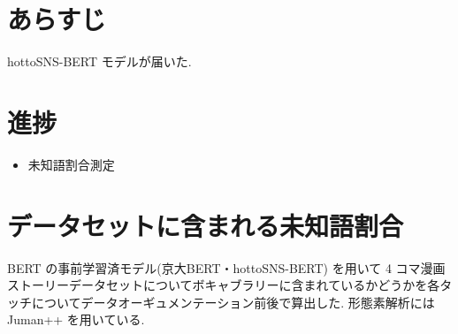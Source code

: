 \documentclass[twocolumn]{jarticle}     %
\begin{document}

\section{あらすじ}
hottoSNS-BERT モデルが届いた.

\section{進捗}

\begin{itemize}
  \item 未知語割合測定
\end{itemize}

\section{データセットに含まれる未知語割合}

BERT の事前学習済モデル(京大BERT・hottoSNS-BERT) を用いて 4 コマ漫画ストーリーデータセットについてボキャブラリーに含まれているかどうかを各タッチについてデータオーギュメンテーション前後で算出した.
形態素解析には Juman++ を用いている.
\end{document}

